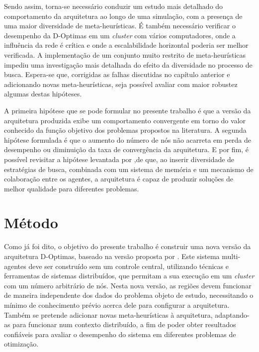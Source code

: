 Sendo assim, torna-se necessário conduzir um estudo mais  detalhado do comportamento da arquitetura ao longo de uma simulação, com a presença de uma maior diversidade de meta-heurísticas. É também necessário verificar o desempenho da D-Optimas em um \textit{cluster} com vários computadores, onde a influência da rede é crítica e onde a escalabilidade horizontal poderia ser melhor verificada. A implementação de um conjunto muito restrito de meta-heurísticas impediu uma investigação mais detalhada do efeito da diversidade no processo de busca. Espera-se que, corrigidas as falhas discutidas no capítulo anterior e adicionando novas meta-heurísticas, seja possível avaliar com maior robustez algumas destas hipóteses. 

A primeira hipótese que se pode formular no presente trabalho é que a versão da arquitetura produzida exibe um comportamento convergente em torno do valor conhecido da função objetivo dos problemas propostos na literatura. A segunda hipótese formulada é que o aumento do número de nós não acarreta em perda de desempenho ou diminuição da taxa de convergência da arquitetura. E por fim, é possível revisitar a hipótese levantada por ,de que, ao inserir diversidade de estratégias
de busca, combinada com um sistema de memória e um mecanismo de colaboração entre
os agentes, a arquitetura é capaz de produzir soluções de melhor qualidade para diferentes problemas.


\section{Método}
\label{sec:metodo}

Como já foi dito, o objetivo do presente trabalho é construir uma nova versão da arquitetura  D-Optimas, baseado na versão proposta por . Este sistema multi-agentes deve ser construído sem um controle central, utilizando técnicas e ferramentas de sistemas distribuídos, que permitam a sua execução em um \textit{cluster} com um número arbitrário de nós. Nesta nova versão, as regiões devem funcionar de maneira independente dos dados do problema objeto de estudo, necessitando o mínimo de conhecimento prévio acerca dele para configurar a arquitetura. Também se pretende adicionar novas meta-heurísticas à arquitetura, adaptando-as para funcionar num contexto distribuído, a fim de poder obter resultados confiáveis para avaliar o desempenho do sistema em diferentes problemas de otimização. 

